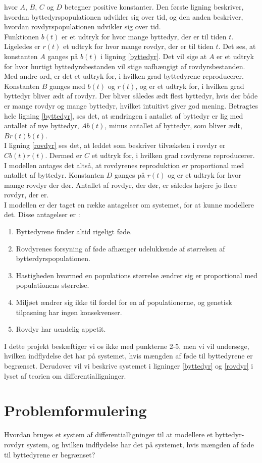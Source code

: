 \hfill \break
hvor $A$, $B$, $C$ og $D$ betegner positive konstanter. Den første ligning beskriver, hvordan byttedyrspopulationen udvikler sig over tid, og den anden beskriver, hvordan rovdyrspopulationen udvikler sig over tid.\\ \hfill \break
Funktionen $b(t)$ er et udtryk for hvor mange byttedyr, der er til tiden $t$. Ligeledes er $r(t)$ et udtryk for hvor mange rovdyr, der er til tiden $t$. Det ses, at konstanten $A$ ganges på $b(t)$ i ligning \eqref{byttedyr}. Det vil sige at $A$ er et udtryk for hvor hurtigt byttedyrsbestanden vil stige uafhængigt af rovdyrsbestanden. Med andre ord, er det et udtryk for, i hvilken grad byttedyrene reproducerer. Konstanten $B$ ganges med $b(t)$ og $r(t)$, og er et udtryk for, i hvilken grad byttedyr bliver ædt af rovdyr. Der bliver således ædt flest byttedyr, hvis der både er mange rovdyr og mange byttedyr, hvilket intuitivt giver god mening. Betragtes hele ligning \eqref{byttedyr}, ses det, at ændringen i antallet af byttedyr er lig med antallet af nye byttedyr, $Ab(t)$, minus antallet af byttedyr, som bliver ædt, $Br(t)b(t)$.\\ \hfill \break
I ligning \eqref{rovdyr} ses det, at leddet som beskriver tilvæksten i rovdyr er $Cb(t)r(t)$. Dermed er $C$ et udtryk for, i hvilken grad rovdyrene reproducerer. I modellen antages det altså, at rovdyrenes reproduktion er proportional med antallet af byttedyr. Konstanten $D$ ganges på $r(t)$ og er et udtryk for hvor mange rovdyr der dør. Antallet af rovdyr, der dør, er således højere jo flere rovdyr, der er. \\ \hfill \break
I modellen er der taget en række antagelser om systemet, for at kunne modellere det. Disse antagelser er \citep{wikiLV}:
\begin{enumerate}
    \item Byttedyrene finder altid rigeligt føde.
    \item Rovdyrenes forsyning af føde afhænger udelukkende af størrelsen af bytterdyrspopulationen.
    \item Hastigheden hvormed en populations størrelse ændrer sig er proportional med populationens størrelse.
    \item Miljøet ændrer sig ikke til fordel for en af populationerne, og genetisk tilpasning har ingen konsekvenser.
    \item Rovdyr har uendelig appetit.
\end{enumerate}
I dette projekt beskæftiger vi os ikke med punkterne 2-5, men vi vil undersøge, hvilken indflydelse det har på systemet, hvis mængden af føde til byttedyrene er begrænset. Derudover vil vi beskrive systemet i ligninger \eqref{byttedyr} og \eqref{rovdyr} i lyset af teorien om differentialligninger.
\hfill \break
\section{Problemformulering} 
Hvordan bruges et system af differentialligninger til at modellere et byttedyr-rovdyr system, og hvilken indflydelse har det på systemet, hvis mængden af føde til byttedyrene er begrænset?


